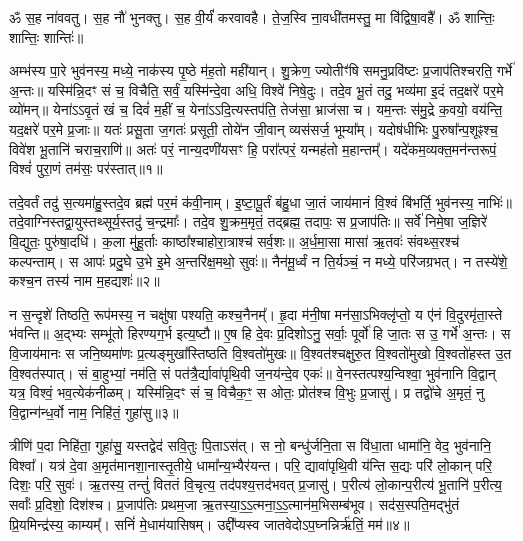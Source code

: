 \setcounter{anuvakam}{0}
ॐ स॒ह ना॑ववतु। 
स॒ह नौ॑ भुनक्तु। 
स॒ह वी॒र्यं॑ करवावहै। 
ते॒ज॒स्वि ना॒वधी॑तमस्तु॒ मा वि॑द्विषा॒वहै᳚। 
ॐ शान्तिः॒ शान्तिः॒ शान्तिः॑॥

अम्भ॑स्य पा॒रे भुव॑नस्य॒ मध्ये॒ नाक॑स्य पृ॒ष्ठे म॑ह॒तो मही॑यान्। 
शु॒क्रेण॒ ज्योतीꣳ॑षि समनु॒प्रवि॑ष्टः प्र॒जाप॑तिश्चरति॒ गर्भे॑ अ॒न्तः॥ 
यस्मि॑न्नि॒दꣳ सं च॒ विचैति॒ सर्वं॒ यस्मि॑न्दे॒वा अधि॒ विश्वे॑ निषे॒दुः। 
तदे॒व भू॒तं तदु॒ भव्य॑मा इ॒दं तद॒क्षरे॑ पर॒मे व्यो॑मन्॥ 
येना॑ऽऽवृ॒तं खं च॒ दिवं॑ म॒हीं च॒ येना॑ऽऽदि॒त्यस्तप॑ति॒ तेज॑सा॒ भ्राज॑सा च। 
यम॒न्तः स॑मु॒द्रे क॒वयो॒ वय॑न्ति॒ यद॒क्षरे॑ पर॒मे प्र॒जाः॥ 
यतः॑ प्रसू॒ता ज॒गतः॑ प्रसूती॒ तोये॑न जी॒वान् व्यस॑सर्ज॒ भूम्या᳚म्। 
यदोष॑धीभिः पु॒रुषा᳚न्प॒शूꣴश्च॒ विवे॑श भू॒तानि॑ चराच॒राणि॑॥ 
अतः॑ परं॒ नान्य॒दणी॑यसꣳ हि॒ परा᳚त्परं॒ यन्मह॑तो म॒हान्तम्᳚। 
यदे॑कम॒व्यक्त॒मन॑न्तरूपं॒ विश्वं॑ पुरा॒णं तम॑सः॒ पर॑स्तात्॥१॥

तदे॒वर्तं तदु॑ स॒त्यमा॑हु॒स्तदे॒व ब्रह्म॑ पर॒मं क॑वी॒नाम्। 
इ॒ष्टा॒पू॒र्तं ब॑हु॒धा जा॒तं जाय॑मानं वि॒श्वं बि॑भर्ति॒ भुव॑नस्य॒ नाभिः॑॥ 
तदे॒वाग्निस्तद्वा॒युस्तथ्सूर्य॒स्तदु॑ च॒न्द्रमाः᳚। 
तदे॒व शु॒क्रम॒मृतं॒ तद्ब्रह्म॒ तदापः॒ स प्र॒जाप॑तिः॥ 
सर्वे॑ निमे॒षा ज॒ज्ञिरे॑ वि॒द्युतः॒ पुरु॑षा॒दधि॑। 
क॒ला मु॑हू॒र्ताः काष्ठा᳚श्चाहोरा॒त्राश्च॑ सर्व॒शः॥ 
अ॒र्ध॒मा॒सा मासा॑ ऋ॒तवः॑ संवथ्स॒रश्च॑ कल्पन्ताम्। 
स आपः॑ प्रदु॒घे उ॒भे इ॒मे अ॒न्तरि॑क्ष॒मथो॒ सुवः॑॥ 
नैन॑मू॒र्ध्वं न ति॒र्यञ्चं॒ न मध्ये॒ परि॑जग्रभत्। 
न तस्ये॑शे॒ कश्च॒न तस्य॑ नाम म॒हद्यशः॑॥२॥

न स॒न्दृशे॑ तिष्ठति॒ रूप॑मस्य॒ न चक्षु॑षा पश्यति॒ कश्च॒नैनम्᳚। 
हृ॒दा म॑नी॒षा मन॑सा॒ऽभिक्लृ॑प्तो॒ य ए॑नं वि॒दुरमृ॑ता॒स्ते भ॑वन्ति॥ 
अ॒द्भ्यः सम्भू॑तो हिरण्यग॒र्भ इत्य॒ष्टौ॥ 
ए॒ष हि दे॒वः प्र॒दिशोऽनु॒ सर्वाः॒ पूर्वो॑ हि जा॒तः स उ॒ गर्भे॑ अ॒न्तः। 
स वि॒जाय॑मानः स जनि॒ष्यमा॑णः प्र॒त्यङ्मुखा᳚स्तिष्ठति वि॒श्वतो॑मुखः॥ 
वि॒श्वत॑श्चक्षुरु॒त वि॒श्वतो॑मुखो वि॒श्वतो॑हस्त उ॒त वि॒श्वत॑स्पात्। 
सं बा॒हुभ्यां॒ नम॑ति॒ सं पत॑त्रै॒र्द्यावा॑पृथि॒वी ज॒नय॑न्दे॒व एकः॑॥ 
वे॒नस्तत्पश्य॒न्विश्वा॒ भुव॑नानि वि॒द्वान् यत्र॒ विश्वं॒ भव॒त्येक॑नीळम्। 
यस्मि॑न्नि॒दꣳ सं च॒ विचैक॒ꣳ॒ स ओतः॒ प्रोत॑श्च वि॒भुः प्र॒जासु॑। 
प्र तद्वो॑चे अ॒मृतं॒ नु वि॒द्वान्ग॑न्ध॒र्वो नाम॒ निहि॑तं॒ गुहा॑सु॥३॥

त्रीणि॑ प॒दा निहि॑ता॒ गुहा॑सु॒ यस्तद्वेद॑ सवि॒तुः पि॒ताऽस॑त्। 
स नो॒ बन्धु॑र्जनि॒ता स वि॑धा॒ता धामा॑नि॒ वेद॒ भुव॑नानि॒ विश्वा᳚। 
यत्र॑ दे॒वा अ॒मृत॑मानशा॒नास्तृ॒तीये॒ धामा᳚न्य॒भ्यैर॑यन्त। 
परि॒ द्यावा॑पृथि॒वी य॑न्ति स॒द्यः परि॑ लो॒कान् परि॒ दिशः॒ परि॒ सुवः॑। 
ऋ॒तस्य॒ तन्तुं॑ विततं वि॒चृत्य॒ तद॑पश्य॒त्तद॑भवत् प्र॒जासु॑। 
प॒रीत्य॑ लो॒कान्प॒रीत्य॑ भू॒तानि॑ प॒रीत्य॒ सर्वाः᳚ प्र॒दिशो॒ दिश॑श्च। 
प्र॒जाप॑तिः प्रथम॒जा ऋ॒तस्या॒ऽ॒ऽ॒त्मना॒ऽ॒ऽ॒त्मान॑म॒भिसम्ब॑भूव। 
सद॑स॒स्पति॒मद्भु॑तं प्रि॒यमिन्द्र॑स्य॒ काम्यम्᳚। 
सनिं॑ मे॒धाम॑यासिषम्। 
उद्दी᳚प्यस्व जातवेदोऽप॒घ्नन्निर्\mbox{}ऋ॑तिं॒ मम॑॥४॥

